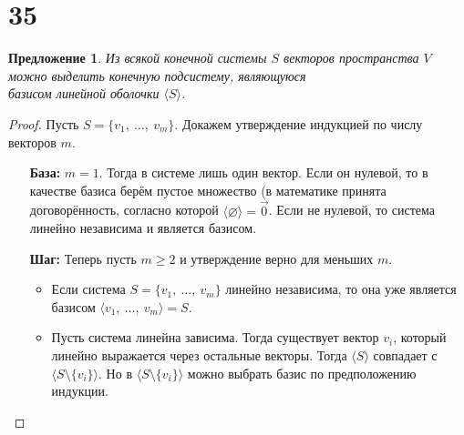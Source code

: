 \documentclass[a4paper,12pt]{article}
\newtheorem*{proposal}{Предложение}
\begin{document}
		\section*{35}
	\begin{proposal}
		Из всякой конечной системы $S$ векторов пространства $V$ можно выделить конечную подсистему, являющуюся\\ базисом линейной оболочки $\langle S \rangle$.
	\end{proposal}
	\begin{proof}
		Пусть $S = \{v_1,\ \ldots,\ v_m\}$. Докажем утверждение индукцией по числу векторов $m$.
		\begin{itemize}
			\item[\textbf{База:}] $m=1$. Тогда в системе лишь один вектор. Если он нулевой, то в качестве базиса берём пустое множество (в математике принята договорённость, согласно которой $\langle \varnothing \rangle = \vec{0}$. Если не нулевой, то система линейно независима и является базисом.
			\item[\textbf{Шаг:}] Теперь пусть $m \geqslant 2$ и утверждение верно для меньших $m$. 
			\begin{itemize}
				\item Если система $S = \{v_1,\ \ldots,\ v_m\}$ линейно независима, то она уже является базисом $\langle v_1,\ \ldots,\ v_m \rangle = S$.
				\item Пусть система линейна зависима. Тогда существует вектор $v_i$, который линейно выражается через остальные векторы. Тогда $\langle S \rangle$ совпадает с $\langle S\setminus \{v_i\}\rangle$. Но в $\langle S\setminus \{v_i\}\rangle$ можно выбрать базис по предположению индукции.
			\end{itemize} 
		\end{itemize}
	\end{proof}
	
\end{document}
